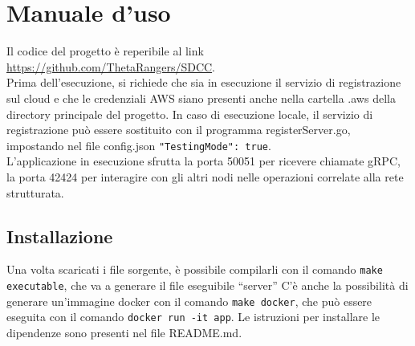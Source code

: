 \documentclass[conference]{IEEEtran}
\begin{document}
\section{Manuale d'uso}
Il codice del progetto è reperibile al link \href{https://github.com/ThetaRangers/SDCC}{https://github.com/ThetaRangers/SDCC}.\\
Prima dell'esecuzione, si richiede che sia in esecuzione il servizio di registrazione sul cloud e che le credenziali
AWS siano presenti anche nella cartella .aws della directory principale del progetto. In caso di esecuzione locale, il servizio
di registrazione può essere sostituito con il programma registerServer.go, impostando nel file config.json \verb!"TestingMode": true!.\\
L'applicazione in esecuzione sfrutta la porta 50051 per ricevere
chiamate gRPC, la porta 42424 per interagire con gli altri nodi nelle operazioni correlate alla rete strutturata.

\subsection{Installazione}
Una volta scaricati i file sorgente, è possibile compilarli con il comando \verb!make executable!, che va a generare il
file eseguibile ``server'' C'è anche la possibilità di generare un'immagine docker con il comando \verb!make docker!, che
può essere eseguita con il comando \verb!docker run -it app!. Le istruzioni per installare le dipendenze sono presenti nel
file README.md.
\end{document}
